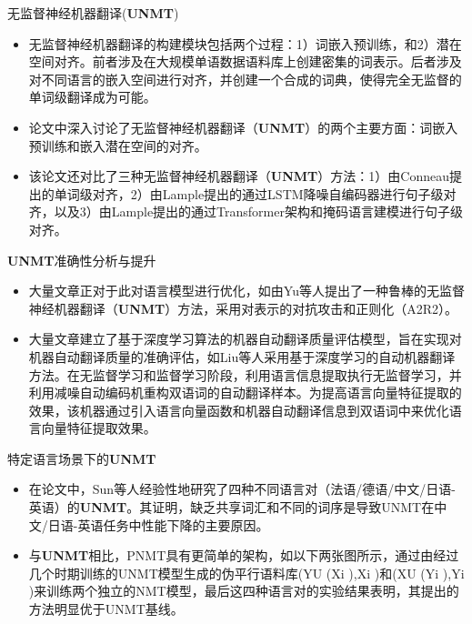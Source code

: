 \documentclass[UTF8]{beamer}
\begin{document}
\begin{frame}{无监督神经机器翻译(\textbf{UNMT})}
    \scriptsize
    \begin{itemize}
        \item 无监督神经机器翻译的构建模块包括两个过程：1）词嵌入预训练，和2）潜在空间对齐。前者涉及在大规模单语数据语料库上创建密集的词表示。后者涉及对不同语言的嵌入空间进行对齐，并创建一个合成的词典，使得完全无监督的单词级翻译成为可能。
        \item 论文中深入讨论了无监督神经机器翻译（\textbf{UNMT}）的两个主要方面：词嵌入预训练和嵌入潜在空间的对齐。
        \item 该论文还对比了三种无监督神经机器翻译（\textbf{UNMT}）方法：1）由Conneau提出的单词级对齐，2）由Lample提出的通过LSTM降噪自编码器进行句子级对齐，以及3）由Lample提出的通过Transformer架构和掩码语言建模进行句子级对齐。
    \end{itemize}
\end{frame}

\begin{frame}{\textbf{UNMT}准确性分析与提升}
    \begin{itemize}
        \item 大量文章正对于此对语言模型进行优化，如由Yu等人提出了一种鲁棒的无监督神经机器翻译（\textbf{UNMT}）方法，采用对表示的对抗攻击和正则化（A2R2）。
        \item 大量文章建立了基于深度学习算法的机器自动翻译质量评估模型，旨在实现对机器自动翻译质量的准确评估，如Liu等人采用基于深度学习的自动机器翻译方法。在无监督学习和监督学习阶段，利用语言信息提取执行无监督学习，并利用减噪自动编码机重构双语词的自动翻译样本。为提高语言向量特征提取的效果，该机器通过引入语言向量函数和机器自动翻译信息到双语词中来优化语言向量特征提取效果。
    \end{itemize}
\end{frame}

\begin{frame}{特定语言场景下的\textbf{UNMT}}
    \begin{itemize}
        \item 在论文中，Sun等人经验性地研究了四种不同语言对（法语/德语/中文/日语-英语）的\textbf{UNMT}。其证明，缺乏共享词汇和不同的词序是导致UNMT在中文/日语-英语任务中性能下降的主要原因。
        \item 与\textbf{UNMT}相比，PNMT具有更简单的架构，如以下两张图所示，通过由经过几个时期训练的UNMT模型生成的伪平行语料库{(YU (Xi ),Xi )}和{(XU (Yi ),Yi )}来训练两个独立的NMT模型，最后这四种语言对的实验结果表明，其提出的方法明显优于UNMT基线。
    \end{itemize}
\end{frame}
\end{document}
